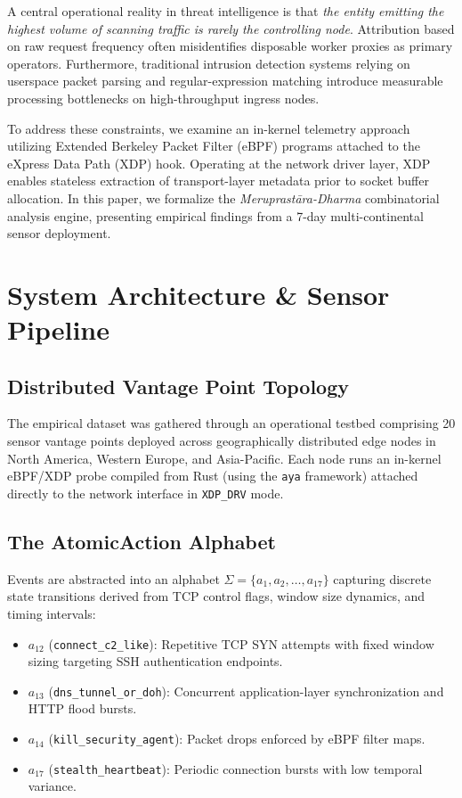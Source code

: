 \documentclass[10pt,twocolumn]{article}
\begin{document}
A central operational reality in threat intelligence is that \textit{the entity emitting the highest volume of scanning traffic is rarely the controlling node}. Attribution based on raw request frequency often misidentifies disposable worker proxies as primary operators. Furthermore, traditional intrusion detection systems relying on userspace packet parsing and regular-expression matching introduce measurable processing bottlenecks on high-throughput ingress nodes.

To address these constraints, we examine an in-kernel telemetry approach utilizing Extended Berkeley Packet Filter (eBPF) programs attached to the eXpress Data Path (XDP) hook. Operating at the network driver layer, XDP enables stateless extraction of transport-layer metadata prior to socket buffer allocation. In this paper, we formalize the \textit{Meruprast\={a}ra-Dharma} combinatorial analysis engine, presenting empirical findings from a 7-day multi-continental sensor deployment.

\section{System Architecture \& Sensor Pipeline}

\subsection{Distributed Vantage Point Topology}
The empirical dataset was gathered through an operational testbed comprising 20 sensor vantage points deployed across geographically distributed edge nodes in North America, Western Europe, and Asia-Pacific. Each node runs an in-kernel eBPF/XDP probe compiled from Rust (using the \texttt{aya} framework) attached directly to the network interface in \texttt{XDP\_DRV} mode.

\subsection{The AtomicAction Alphabet}
Events are abstracted into an alphabet $\Sigma = \{a_1, a_2, \dots, a_{17}\}$ capturing discrete state transitions derived from TCP control flags, window size dynamics, and timing intervals:
\begin{itemize}
    \item $a_{12}$ (\texttt{connect\_c2\_like}): Repetitive TCP SYN attempts with fixed window sizing targeting SSH authentication endpoints.
    \item $a_{13}$ (\texttt{dns\_tunnel\_or\_doh}): Concurrent application-layer synchronization and HTTP flood bursts.
    \item $a_{14}$ (\texttt{kill\_security\_agent}): Packet drops enforced by eBPF filter maps.
    \item $a_{17}$ (\texttt{stealth\_heartbeat}): Periodic connection bursts with low temporal variance.
\end{itemize}
\end{document}
